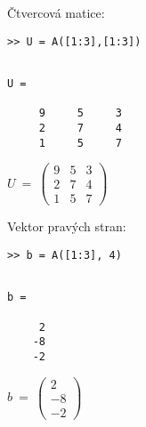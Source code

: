 \documentclass[a4paper,10pt]{article}
\begin{document}
\par Čtvercová matice:

\begin{verbatim}
>> U = A([1:3],[1:3])
\end{verbatim}

\begin{minipage}[t]{.5\textwidth}
\begin{verbatim}

U =

     9     5     3 
     2     7     4 
     1     5     7 

\end{verbatim}
\end{minipage}%
\begin{minipage}[t]{.5\textwidth}

\bigskip
\bigskip

$
U~=~
\left( \begin{array}{rrr}
9 & 5 & 3 \\
2 & 7 & 4 \\
1 & 5 & 7 
\end{array} \right)
$

\vfill
\end{minipage}

\par Vektor pravých stran:

\begin{verbatim}
>> b = A([1:3], 4)
\end{verbatim}


\begin{minipage}[t]{.5\textwidth}
\begin{verbatim}

b =

     2
    -8
    -2

\end{verbatim}
\end{minipage}%
\begin{minipage}[t]{.5\textwidth}

\bigskip
\bigskip

$
b~=~
\left( \begin{array}{r}
  2 \\
 -8 \\
 -2
\end{array} \right)
$
\vfill
\end{minipage}
\end{document}
